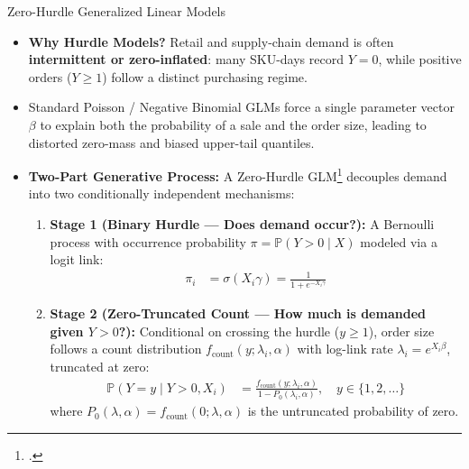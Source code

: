 \documentclass[11pt]{beamer}
\begin{document}
\begin{frame}[allowframebreaks]{Zero-Hurdle Generalized Linear Models}
\begin{small}
\begin{itemize}
\item \textbf{Why Hurdle Models?} Retail and supply-chain demand is often \textbf{intermittent or zero-inflated}: many SKU-days record $Y = 0$, while positive orders ($Y \geq 1$) follow a distinct purchasing regime.
\item Standard Poisson / Negative Binomial GLMs force a single parameter vector $\beta$ to explain both the probability of a sale and the order size, leading to distorted zero-mass and biased upper-tail quantiles.
\item \textbf{Two-Part Generative Process:} A Zero-Hurdle GLM\footcite[Introduced by][]{mullahy1986} decouples demand into two conditionally independent mechanisms:
\begin{enumerate}
\item \textbf{Stage 1 (Binary Hurdle --- Does demand occur?):} A Bernoulli process with occurrence probability $\pi = \mathbb{P}(Y > 0 \mid X)$ modeled via a logit link:
\begin{align*}
\pi_{i} &= \sigma(X_{i}\gamma) = \frac{1}{1 + e^{-X_{i}\gamma}}
\end{align*}
\item \textbf{Stage 2 (Zero-Truncated Count --- How much is demanded given $Y > 0$?):} Conditional on crossing the hurdle ($y \geq 1$), order size follows a count distribution $f_{\text{count}}(y; \lambda_i, \alpha)$ with log-link rate $\lambda_i = e^{X_i\beta}$, truncated at zero:
\begin{align*}
\mathbb{P}(Y = y \mid Y > 0, X_i) &= \frac{f_{\text{count}}(y; \lambda_i, \alpha)}{1 - P_0(\lambda_i, \alpha)}, \quad y \in \{1, 2, \dots\}
\end{align*}
where $P_0(\lambda, \alpha) = f_{\text{count}}(0; \lambda, \alpha)$ is the untruncated probability of zero.
\end{enumerate}
\end{itemize}
\end{small}


\end{frame}
\end{document}
